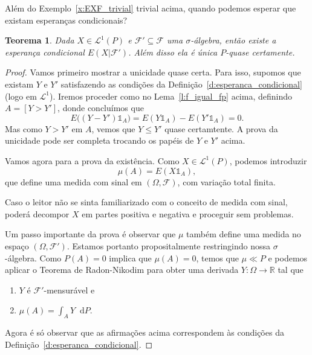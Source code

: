 \documentclass[reqno, final]{book}
\newcommand*\1{\mathds{1}}
\newtheorem{theorem}{Teorema}[section]
\renewcommand*\d{\mathop{}\!\mathrm{d}}
\begin{document}
Além do Exemplo~\ref{x:EXF_trivial} trivial acima, quando podemos esperar que existam esperanças condicionais?

\begin{theorem}
  Dada $X \in \mathcal{L}^1(P)$ e $\mathcal{F}' \subseteq \mathcal{F}$ uma $\sigma$-álgebra, então existe a esperança condicional $E(X|\mathcal{F}')$.
  Além disso ela é única $P$-quase certamente.
\end{theorem}

\begin{proof}
  Vamos primeiro mostrar a unicidade quase certa.
  Para isso, supomos que existam $Y$ e $Y'$ satisfazendo as condições da Definição~\ref{d:esperanca_condicional} (logo em $\mathcal{L}^1$).
  Iremos proceder como no Lema~\ref{l:f_igual_fp} acima, definindo $A = [Y > Y']$, donde concluímos que
  \begin{equation}
    E\big( (Y - Y')\1_{A} \big) = E(Y \1_{A}) - E(Y' \1_{A}) = 0.
  \end{equation}
  Mas como $Y > Y'$ em $A$, vemos que $Y \leq Y'$ quase certamtente.
  A prova da unicidade pode ser completa trocando os papéis de $Y$ e $Y'$ acima.

  Vamos agora para a prova da existência.
  Como $X \in \mathcal{L}^1(P)$, podemos introduzir
  \begin{equation}
    \mu(A) = E(X \1_{A}),
  \end{equation}
  que define uma medida com sinal em $(\Omega, \mathcal{F})$, com variação total finita.

  Caso o leitor não se sinta familiarizado com o conceito de medida com sinal, poderá decompor $X$ em partes positiva e negativa e proceguir sem problemas.

  Um passo importante da prova é observar que $\mu$ também define uma medida no espaço $(\Omega, \mathcal{F}')$.
  Estamos portanto propositalmente restringindo nossa $\sigma$-álgebra.
  Como $P(A) = 0$ implica que $\mu(A) = 0$, temos que $\mu \ll P$ e podemos aplicar o Teorema de Radon-Nikodim para obter uma derivada $Y:\Omega \to \mathbb{R}$ tal que
  \begin{enumerate}[\quad a)]
  \item $Y$ é $\mathcal{F}'$-mensurável e
  \item $\mu(A) = \int_A Y \d P$.
  \end{enumerate}
  Agora é só observar que as afirmações acima correspondem às condições da Definição~\ref{d:esperanca_condicional}.
\end{proof}
\end{document}
